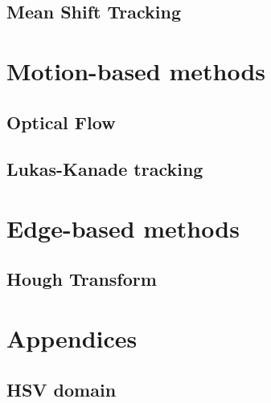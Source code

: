 \documentclass[a4paper]{article}
\begin{document}
\subsection{Mean Shift Tracking}









\section{Motion-based methods}

\subsection{Optical Flow}



\subsection{Lukas-Kanade tracking}



\section{Edge-based methods}

\subsection{Hough Transform}






\newpage
\appendix

\section{Appendices}

\newpage
\subsection{HSV domain}
\label{app:hsv_domain}
\end{document}
